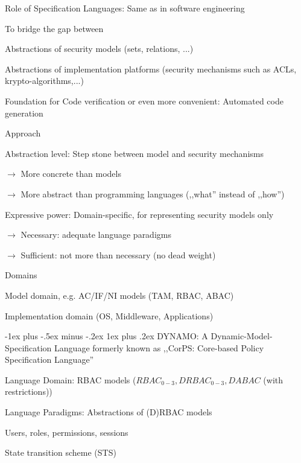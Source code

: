 \documentclass[a4paper]{article}
\makeatletter
\renewcommand{\subsubsection}{\@startsection{subsubsection}{3}{0mm}%
                {-1ex plus -.5ex minus -.2ex}%
                {1ex plus .2ex}%
                {\normalfont\small\bfseries}}
\makeatother
\begin{document}
\begin{multicols}{3}
    Role of Specification Languages: Same as in software engineering
    \begin{itemize*}
        \item To bridge the gap between
        \begin{itemize*}
            \item Abstractions of security models (sets, relations, ...)
            \item Abstractions of implementation platforms (security mechanisms such as ACLs, krypto-algorithms,...)
        \end{itemize*}
        \item Foundation for Code verification or even more convenient: Automated code generation
    \end{itemize*}

    Approach
    \begin{itemize*}
        \item Abstraction level: Step stone between model and security mechanisms
        \item[$\rightarrow$] More concrete than models
        \item[$\rightarrow$] More abstract than programming languages (,,what'' instead of ,,how'')
        \item Expressive power: Domain-specific, for representing security models only
        \item[$\rightarrow$] Necessary: adequate language paradigms
        \item[$\rightarrow$] Sufficient: not more than necessary (no dead weight)
    \end{itemize*}

    Domains
    \begin{itemize*}
        \item Model domain, e.g. AC/IF/NI models (TAM, RBAC, ABAC)
        \item Implementation domain (OS, Middleware, Applications)
    \end{itemize*}

    \subsubsection{DYNAMO: A Dynamic-Model-Specification Language}
    formerly known as ,,CorPS: Core-based Policy Specification Language''

    Language Domain: RBAC models ($RBAC_{0-3},DRBAC_{0-3}, DABAC$ (with restrictions))

    Language Paradigms: Abstractions of (D)RBAC models
    \begin{itemize*}
        \item Users, roles, permissions, sessions
        \item State transition scheme (STS)
    \end{itemize*}


\end{multicols}
\end{document}
